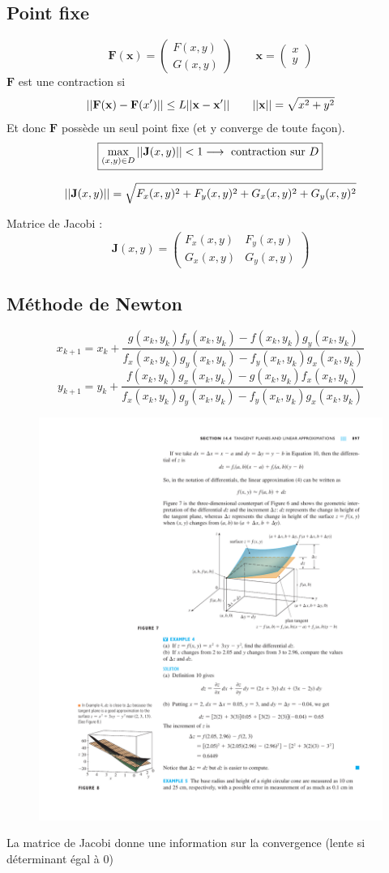 \documentclass[resume]{subfiles}
\begin{document}
\subsection{Point fixe}
$$\boxed{\mathbf{F}(\mathbf{x})=\begin{pmatrix}
F(x,y)\\
G(x,y)
\end{pmatrix}\qquad \mathbf{x}=\begin{pmatrix}
x\\y
\end{pmatrix}}$$
$\mathbf{F}$ est une contraction si
$$\abs{\abs{\mathbf{F}(\mathbf{x})-\mathbf{F}(x')}}\leq L\abs{\abs{\mathbf{x}-\mathbf{x}'}}\qquad \abs{\abs{\mathbf{x}}}=\sqrt{x^2+y^2}$$
Et donc $\mathbf{F}$ possède un seul point fixe (et y converge de toute façon).
$$\boxed{\max_{(x,y)\in D}\abs{\abs{\mathbf{J}(x,y)}}<1\longrightarrow \text{ contraction sur }D}$$
\begin{scriptsize}
$$\abs{\abs{\mathbf{J}(x,y)}}=\sqrt{F_x(x,y)^2+F_y(x,y)^2+G_x(x,y)^2+G_y(x,y)^2}$$
\end{scriptsize}
Matrice de Jacobi :
$$\mathbf{J}(x,y)=\begin{pmatrix}
F_x(x,y) & F_y(x,y)\\
G_x(x,y) & G_y(x,y)
\end{pmatrix}$$
\subsection{Méthode de Newton}
\begin{small}
$$\boxed{x_{k+1}=x_k+\frac{g(x_k,y_k)f_y(x_k,y_k)-f(x_k,y_k)g_y(x_k,y_k)}{f_x(x_k,y_k)g_y(x_k,y_k)-f_y(x_k,y_k)g_x(x_k,y_k)}}$$
$$\boxed{y_{k+1}=y_k+\frac{f(x_k,y_k)g_x(x_k,y_k)-g(x_k,y_k)f_x(x_k,y_k)}{f_x(x_k,y_k)g_y(x_k,y_k)-f_y(x_k,y_k)g_x(x_k,y_k)}}$$
\end{small}
\begin{figure}[H]
\centering
\includegraphics[width=0.8\columnwidth]{img_18.pdf}
\end{figure}
La matrice de Jacobi donne une information sur la convergence (lente si déterminant égal à 0)
\end{document}
